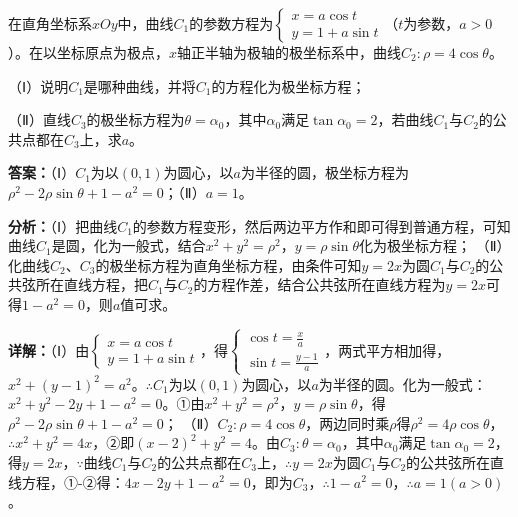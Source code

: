 \begin{question}[points=10]
[选修4-4：坐标系与参数方程]

在直角坐标系$xOy$中，曲线$C_1$的参数方程为$\begin{cases} x=a\cos t \\ y=1+a\sin t \end{cases}$（$t$为参数，$a>0$）。在以坐标原点为极点，$x$轴正半轴为极轴的极坐标系中，曲线$C_2:\rho=4\cos\theta$。

（Ⅰ）说明$C_1$是哪种曲线，并将$C_1$的方程化为极坐标方程；

（Ⅱ）直线$C_3$的极坐标方程为$\theta=\alpha_0$，其中$\alpha_0$满足$\tan\alpha_0=2$，若曲线$C_1$与$C_2$的公共点都在$C_3$上，求$a$。
\begin{solution}
\textbf{答案：}（Ⅰ）$C_1$为以$(0,1)$为圆心，以$a$为半径的圆，极坐标方程为$\rho^2-2\rho\sin\theta+1-a^2=0$；（Ⅱ）$a=1$。

\textbf{分析：}（Ⅰ）把曲线$C_1$的参数方程变形，然后两边平方作和即可得到普通方程，可知曲线$C_1$是圆，化为一般式，结合$x^2+y^2=\rho^2$，$y=\rho\sin\theta$化为极坐标方程；
（Ⅱ）化曲线$C_2$、$C_3$的极坐标方程为直角坐标方程，由条件可知$y=2x$为圆$C_1$与$C_2$的公共弦所在直线方程，把$C_1$与$C_2$的方程作差，结合公共弦所在直线方程为$y=2x$可得$1-a^2=0$，则$a$值可求。

\textbf{详解：}（Ⅰ）由$\begin{cases} x=a\cos t \\ y=1+a\sin t \end{cases}$，得$\begin{cases} \cos t=\frac{x}{a} \\ \sin t=\frac{y-1}{a} \end{cases}$，两式平方相加得，$x^2+(y-1)^2=a^2$。$\therefore C_1$为以$(0,1)$为圆心，以$a$为半径的圆。化为一般式：$x^2+y^2-2y+1-a^2=0$。①由$x^2+y^2=\rho^2$，$y=\rho\sin\theta$，得$\rho^2-2\rho\sin\theta+1-a^2=0$；
（Ⅱ）$C_2:\rho=4\cos\theta$，两边同时乘$\rho$得$\rho^2=4\rho\cos\theta$，$\therefore x^2+y^2=4x$，②即$(x-2)^2+y^2=4$。由$C_3:\theta=\alpha_0$，其中$\alpha_0$满足$\tan\alpha_0=2$，得$y=2x$，$\because$曲线$C_1$与$C_2$的公共点都在$C_3$上，$\therefore y=2x$为圆$C_1$与$C_2$的公共弦所在直线方程，①-②得：$4x-2y+1-a^2=0$，即为$C_3$，$\therefore 1-a^2=0$，$\therefore a=1(a>0)$。
\end{solution}
\end{question}

